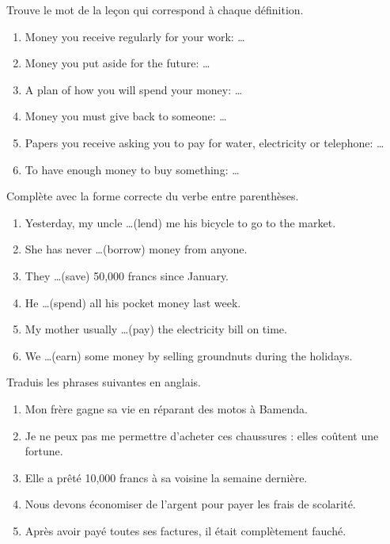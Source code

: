 \documentclass[11pt]{article}
\newcounter{popsec}
\newcounter{popsub}
\newcommand{\courssub}[1]{%
  \stepcounter{popsub}%
  \par\vspace{9pt}\noindent{\popxbold\fontsize{11.5}{13}\selectfont\color{popink}{\color{poporange}\thepopsec.\thepopsub}\hspace{6pt}#1}\par\nopagebreak\vspace{4pt}
}
\begin{document}
\begin{exercice}
Trouve le mot de la leçon qui correspond à chaque définition.
\begin{enumerate}
\item Money you receive regularly for your work: \ldots
\item Money you put aside for the future: \ldots
\item A plan of how you will spend your money: \ldots
\item Money you must give back to someone: \ldots
\item Papers you receive asking you to pay for water, electricity or telephone: \ldots
\item To have enough money to buy something: \ldots
\end{enumerate}
\end{exercice}

\begin{exercice}
Complète avec la forme correcte du verbe entre parenthèses.
\begin{enumerate}
\item Yesterday, my uncle \ldots (lend) me his bicycle to go to the market.
\item She has never \ldots (borrow) money from anyone.
\item They \ldots (save) 50,000 francs since January.
\item He \ldots (spend) all his pocket money last week.
\item My mother usually \ldots (pay) the electricity bill on time.
\item We \ldots (earn) some money by selling groundnuts during the holidays.
\end{enumerate}
\end{exercice}

\courssub{Je m'entraîne}

\begin{exercice}[Traduction]
Traduis les phrases suivantes en anglais.
\begin{enumerate}
\item Mon frère gagne sa vie en réparant des motos à Bamenda.
\item Je ne peux pas me permettre d'acheter ces chaussures : elles coûtent une fortune.
\item Elle a prêté 10,000 francs à sa voisine la semaine dernière.
\item Nous devons économiser de l'argent pour payer les frais de scolarité.
\item Après avoir payé toutes ses factures, il était complètement fauché.
\end{enumerate}
\end{exercice}
\end{document}
